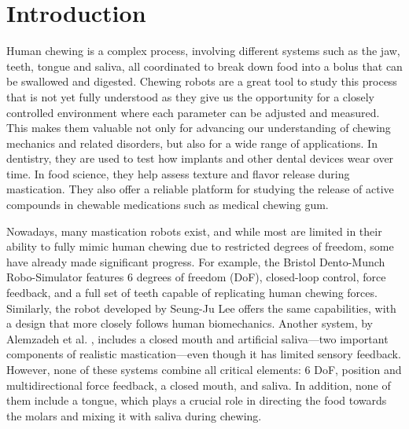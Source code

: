 \section{Introduction}


Human chewing is a complex process, involving different systems such as the jaw, teeth, tongue and saliva, all coordinated to break down food into 
a bolus that can be swallowed and digested. Chewing robots are a great tool to study this process that is not yet fully understood as they give us the opportunity 
for a closely controlled environment where each parameter can be adjusted and measured. This makes them valuable not only for advancing our understanding of 
chewing mechanics and related disorders, but also for a wide range of applications. In dentistry, they are used to test how implants and other dental devices
 wear over time. In food science, they help assess texture and flavor release during mastication. They also offer a reliable platform for studying the release of 
 active compounds in chewable medications such as medical chewing gum.

Nowadays, many mastication robots exist, and while most are limited in their ability to fully mimic human chewing due to restricted degrees of freedom, 
some have already made significant progress. For example, the Bristol Dento-Munch Robo-Simulator \cite{BristolChewingRobot} features 6 degrees of freedom 
(DoF), closed-loop control, force feedback, and a full set of teeth capable of replicating human chewing forces. Similarly, the robot developed by Seung-Ju 
Lee \cite{ChewingRobotLinearActuator} offers the same capabilities, with a design that more closely follows human biomechanics. Another system, by Alemzadeh 
et al. \cite{ChewingRobotGums}, includes a closed mouth and artificial saliva—two important components of realistic mastication—even though it has limited 
sensory feedback. However, none of these systems combine all critical elements: 6 DoF, position and multidirectional force feedback, a closed mouth, and 
saliva. In addition, none of them include a tongue, which plays a crucial role in directing the food towards the molars and mixing it with saliva during 
chewing.


